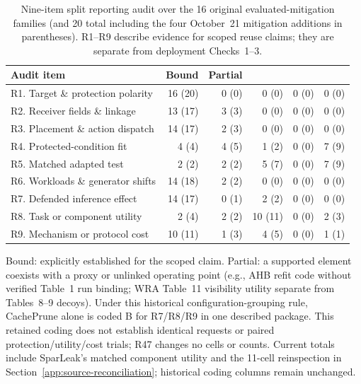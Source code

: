 \begin{table}[t]\centering\footnotesize
\caption{Nine-item split reporting audit over the 16 original evaluated-mitigation families (and 20 total including the four October~21 mitigation additions in parentheses). R1--R9 describe evidence for scoped reuse claims; they are separate from deployment Checks~1--3.}\label{tab:six-check-audit}
\setlength{\tabcolsep}{3.5pt}
\begin{tabularx}{\columnwidth}{@{}Yrrrrr@{}}\toprule
Audit item & Bound & Partial & \NRR{} & \NRV{} & \NA{}\\\midrule
R1. Target \& protection polarity & 16 (20) & 0 (0) & 0 (0) & 0 (0) & 0 (0)\\
R2. Receiver fields \& linkage & 13 (17) & 3 (3) & 0 (0) & 0 (0) & 0 (0)\\
R3. Placement \& action dispatch & 14 (17) & 2 (3) & 0 (0) & 0 (0) & 0 (0)\\
R4. Protected-condition fit & 4 (4) & 4 (5) & 1 (2) & 0 (0) & 7 (9)\\
R5. Matched adapted test & 2 (2) & 2 (2) & 5 (7) & 0 (0) & 7 (9)\\
R6. Workloads \& generator shifts & 14 (18) & 2 (2) & 0 (0) & 0 (0) & 0 (0)\\
R7. Defended inference effect & 14 (17) & 0 (1) & 2 (2) & 0 (0) & 0 (0)\\
R8. Task or component utility & 2 (4) & 2 (2) & 10 (11) & 0 (0) & 2 (3)\\
R9. Mechanism or protocol cost & 10 (11) & 1 (3) & 4 (5) & 0 (0) & 1 (1)\\\bottomrule
\end{tabularx}
\par\smallskip\raggedright\footnotesize
Bound: explicitly established for the scoped claim. Partial: a supported element coexists with a proxy or unlinked operating point (e.g., AHB refit code without verified Table~1 run binding; WRA Table~11 visibility utility separate from Tables~8--9 decoys). Under this historical configuration-grouping rule, CachePrune alone is coded B for R7/R8/R9 in one described package. This retained coding does not establish identical requests or paired protection/utility/cost trials; R47 changes no cells or counts. Current totals include SparLeak's matched component utility and the 11-cell reinspection in Section~\ref{app:source-reconciliation}; historical coding columns remain unchanged.
\end{table}

